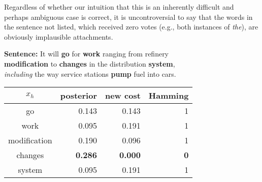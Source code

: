 \documentclass[11pt,letterpaper]{article}
\newcommand{\ignore}[1]{}
\newcommand{\miguelcomment}[1]{\ignore{\textcolor{red}{{\textbf{[#1 --\textsc{miguel}]}}}}}
\begin{document}
Regardless of whether our intuition that this is an inherently difficult and perhaps ambiguous case is correct, it is uncontroversial to say that the words in the sentence not listed, which received zero votes (e.g., both instances of \emph{the}), are obviously implausible attachments.

\begin{table}[t]
\ignore{\miguelcomment{Add Sentence: here or Example: here}} \textbf{Sentence:} It will \textbf{go} for \textbf{work} ranging from refinery\\ \textbf{modification} to \textbf{changes} in the distribution \textbf{system},\\ \emph{including} the way service stations \textbf{pump} fuel into cars.

\begin{center}
\begin{tabular}{|c|r|r|r|}
\hline
\multicolumn{1}{|c}{$x_h$}                                                                       & \multicolumn{1}{|c|}{posterior}        &
\multicolumn{1}{c|}{new cost}                                                           &
\multicolumn{1}{c|}{Hamming}                                                               \\ \hline
go                                                                                               & 0.143   &  0.143    & 1                                                                                                            \\
work                                                                                                & 0.095  & 0.191 & 1                                                                                                                 \\
modification                                                                                        & 0.190            & 0.096     &1                                                                                                    \\
changes                                                                                             & \textbf{0.286}   & \textbf{0.000} & \textbf{0}                                                                                                                  \\
system                                                                                              & 0.095     & 0.191    & 1                                                                                                       \\

\end{tabular}
\end{center}
\end{table}
\end{document}
